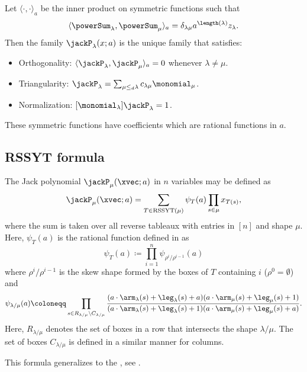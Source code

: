 Let $\langle \cdot, \cdot \rangle_a$ be the inner product on symmetric functions
such that
\[
\langle \powerSum_\lambda, \powerSum_\mu \rangle_a
=
\delta_{\lambda\mu} a^{\length(\lambda)} z_\lambda.
\]
Then the family $\jackP_\lambda(x;a)$ is the unique family that satisfies:

\begin{itemize}
\item Orthogonality:
$\langle \jackP_\lambda, \jackP_\mu \rangle_a = 0$ whenever
$\lambda \neq \mu$.
\item Triangularity:
$\jackP_\lambda = \sum_{\mu \leq_d \lambda } c_{\lambda \mu} \monomial_\mu$.
\item Normalization: $[\monomial_\lambda]\jackP_\lambda = 1$.
\end{itemize}

These symmetric functions have coefficients which are rational functions in $a$.




\subsection[jackTableauFormula]{RSSYT formula}


The Jack polynomial $\jackP_\mu(\xvec;a)$ in $n$ variables may be defined as
\[
\jackP_\mu(\xvec;a)
=
\sum_{T \in \textrm{RSSYT}(\mu)} \psi_T(a)
\prod_{s \in \mu} x_{T(s)},
\]
where the sum is taken over all reverse tableaux with entries in $[n]$ and
shape $\mu$.
Here, $\psi_T(a)$ is the rational function defined in \cite{Macdonald1995} as
\begin{equation*}
\psi_T(a)
\coloneqq
\prod_{i=1}^n \psi_{\rho^i/\rho^{i-1}}(a)
\end{equation*}
where $\rho^i/\rho^{i-1}$ is the skew shape formed by the boxes of $T$
containing $i$
($\rho^0 = \emptyset$)
and
\begin{equation*}
\psi_{\lambda/\mu}(a)
\coloneqq
\prod_{s \in R_{\lambda/\mu} \setminus C_{\lambda/\mu} }
\frac{
(a \cdot\arm_\lambda(s) + \leg_\lambda(s) + a)(a \cdot \arm_\mu(s) + \leg_\mu(s) + 1)
}{
(a\cdot \arm_\lambda(s) + \leg_\lambda(s) + 1)(a \cdot\arm_\mu(s) + \leg_\mu(s) + a)
}.
\end{equation*}
Here, $R_{\lambda/\mu}$ denotes the set of boxes in a row that intersects the
shape $\lambda/\mu$.
The set of boxes $C_{\lambda/\mu}$ is defined in a similar manner for columns.

This formula generalizes to the
\label{superJackPolynomial}, see
\cite{SergeevVeselov2005}.

